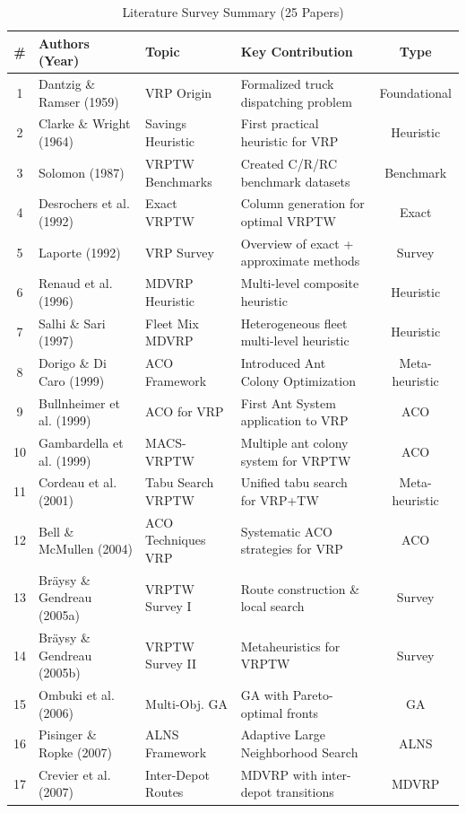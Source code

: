 \documentclass[10pt,conference]{IEEEtran}
\begin{document}
\begin{table}[t]
\caption{Literature Survey Summary (25 Papers)}
\label{tab:literature}
\begin{center}
\footnotesize
\begin{tabular}{|c|l|l|l|c|}
\hline
\textbf{\#} & \textbf{Authors (Year)} & \textbf{Topic} & \textbf{Key Contribution} & \textbf{Type} \\
\hline
1 & Dantzig \& Ramser (1959) & VRP Origin & Formalized truck dispatching problem & Foundational \\
2 & Clarke \& Wright (1964) & Savings Heuristic & First practical heuristic for VRP & Heuristic \\
3 & Solomon (1987) & VRPTW Benchmarks & Created C/R/RC benchmark datasets & Benchmark \\
4 & Desrochers et al. (1992) & Exact VRPTW & Column generation for optimal VRPTW & Exact \\
5 & Laporte (1992) & VRP Survey & Overview of exact + approximate methods & Survey \\
6 & Renaud et al. (1996) & MDVRP Heuristic & Multi-level composite heuristic & Heuristic \\
7 & Salhi \& Sari (1997) & Fleet Mix MDVRP & Heterogeneous fleet multi-level heuristic & Heuristic \\
8 & Dorigo \& Di Caro (1999) & ACO Framework & Introduced Ant Colony Optimization & Meta-heuristic \\
9 & Bullnheimer et al. (1999) & ACO for VRP & First Ant System application to VRP & ACO \\
10 & Gambardella et al. (1999) & MACS-VRPTW & Multiple ant colony system for VRPTW & ACO \\
11 & Cordeau et al. (2001) & Tabu Search VRPTW & Unified tabu search for VRP+TW & Meta-heuristic \\
12 & Bell \& McMullen (2004) & ACO Techniques VRP & Systematic ACO strategies for VRP & ACO \\
13 & Br{\"a}ysy \& Gendreau (2005a) & VRPTW Survey I & Route construction \& local search & Survey \\
14 & Br{\"a}ysy \& Gendreau (2005b) & VRPTW Survey II & Metaheuristics for VRPTW & Survey \\
15 & Ombuki et al. (2006) & Multi-Obj. GA & GA with Pareto-optimal fronts & GA \\
16 & Pisinger \& Ropke (2007) & ALNS Framework & Adaptive Large Neighborhood Search & ALNS \\
17 & Crevier et al. (2007) & Inter-Depot Routes & MDVRP with inter-depot transitions & MDVRP \\

\end{tabular}
\end{center}
\end{table}
\end{document}
